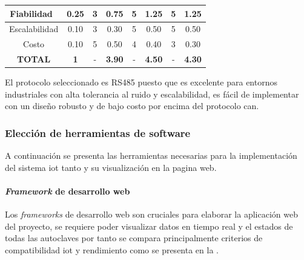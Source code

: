 \begin{tabla}[bajo]
{\begin{tabular}{|c|c|c|c|c|c|c|c|}
\hline
\rowcolor[rgb]{0.027,0.894,0.675} Fiabilidad~                                                             & 0.25                                                                       & 3               & 0.75                 & 5               & 1.25                 & 5               & 1.25                  \\ 
\hline
Escalabilidad                                                                                             & 0.10                                                                       & 3               & 0.30                 & 5               & 0.50                 & 5               & 0.50                  \\ 
\hline
Costo                                                                                                     & 0.10                                                                       & 5               & 0.50                 & 4               & 0.40                 & 3               & 0.30                  \\ 
\hline
\textbf{TOTAL}                                                                                            & \textbf{1}                                                                 & -               & \textbf{3.90}        & -               & \textbf{4.50}        & -               & \textbf{4.30}         \\
\hline
\end{tabular}
}
\end{tabla}
\newpage
El protocolo seleccionado es RS485 puesto que es excelente para entornos industriales con alta tolerancia al ruido y escalabilidad, es fácil de implementar con un diseño robusto y de bajo costo por encima del protocolo \acrshort{can}.

\subsubsection{Elección de herramientas de software}
A continuación se presenta las herramientas necesarias para la implementación del sistema \acrshort{iot} tanto y su visualización en la pagina web.
\paragraph{\textit{Framework} de desarrollo web}
Los \textit{frameworks} de desarrollo web son cruciales para elaborar la aplicación web del proyecto, se requiere poder visualizar datos en tiempo real y el estados de todas las autoclaves por tanto se compara principalmente criterios de compatibilidad \acrshort{iot} y rendimiento como se presenta en la .

